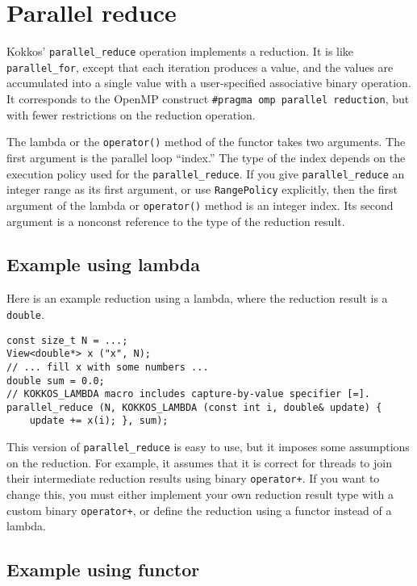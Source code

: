 \section{Parallel reduce}

Kokkos' \lstinline!parallel_reduce! operation implements a reduction.
It is like \lstinline!parallel_for!, except that each iteration
produces a value, and the values are accumulated into a single value
with a user-specified associative binary operation.  It corresponds to
the OpenMP construct \lstinline!#pragma omp parallel reduction!, but
with fewer restrictions on the reduction operation.

The lambda or the \lstinline!operator()! method of the functor takes two arguments.
The first argument is the parallel loop ``index.''
The type of the index depends on the execution policy used for the \lstinline!parallel_reduce!.
If you give \lstinline!parallel_reduce! an integer range as its first argument,
or use \lstinline!RangePolicy! explicitly,
then the first argument of the lambda or \lstinline!operator()! method is an integer index.
Its second argument is a nonconst reference to the type of the reduction result.

\subsection{Example using lambda}

Here is an example reduction using a lambda,
where the reduction result is a \lstinline!double!.
\begin{lstlisting}
const size_t N = ...;
View<double*> x ("x", N);
// ... fill x with some numbers ... 
double sum = 0.0;
// KOKKOS_LAMBDA macro includes capture-by-value specifier [=].
parallel_reduce (N, KOKKOS_LAMBDA (const int i, double& update) {
    update += x(i); }, sum);
\end{lstlisting}
This version of \verb!parallel_reduce! is easy to use,
but it imposes some assumptions on the reduction.
For example, it assumes that it is correct for threads to join their intermediate reduction results using binary \lstinline!operator+!.
If you want to change this, you must either implement your own reduction result type with a custom binary \lstinline!operator+!,
or define the reduction using a functor instead of a lambda.

\subsection{Example using functor}

